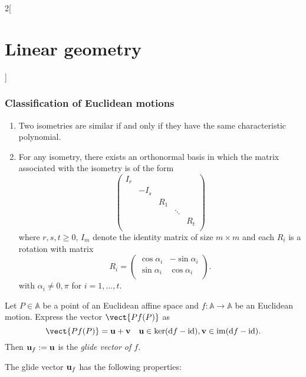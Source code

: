 \documentclass[../../../main.tex]{subfiles}
\begin{document}
\begin{multicols}{2}[\section{Linear geometry}]
    \subsubsection*{Classification of Euclidean motions}
    \begin{theorem}
        \hfill
        \begin{enumerate}
            \item Two isometries are similar if and only if they have the same characteristic polynomial.
            \item For any isometry, there exists an orthonormal basis in which the matrix associated with the isometry is of the form  $$\begin{pmatrix}
                          I_r &      &     &        &     \\
                              & -I_s &     &        &     \\
                              &      & R_1 &        &     \\
                              &      &     & \ddots &     \\
                              &      &     &        & R_t \\
                      \end{pmatrix}$$ where $r,s,t\geq 0$, $I_m$ denote the identity matrix of size $m\times m$ and each $R_i$ is a rotation with matrix $$R_i=\begin{pmatrix}
                          \cos\alpha_i & -\sin\alpha_i \\
                          \sin\alpha_i & \cos\alpha_i  \\
                      \end{pmatrix}.$$ with $\alpha_i\ne0,\pi$ for $i=1,\ldots,t$.
        \end{enumerate}
    \end{theorem}
    \begin{definition}
        Let $P\in\mathbb{A}$ be a point of an Euclidean affine space and $f:\mathbb{A}\rightarrow\mathbb{A}$ be an Euclidean motion. Express the vector $\vect{Pf(P)}$ as $$\vect{Pf(P)}=\vectorfunction{u}+\vectorfunction{v}\quad\vectorfunction{u}\in\ker(\dd f-\id),\vectorfunction{v}\in\im(\dd f-\id).$$ Then $\boldsymbol{\mathrm{u}}_f:=\boldsymbol{\mathrm{u}}$ is the \textit{glide vector of $f$}.
    \end{definition}
    \begin{prop}
        The glide vector $\boldsymbol{\mathrm{u}}_f$ has the following properties:

\end{prop}
\end{multicols}
\end{document}
